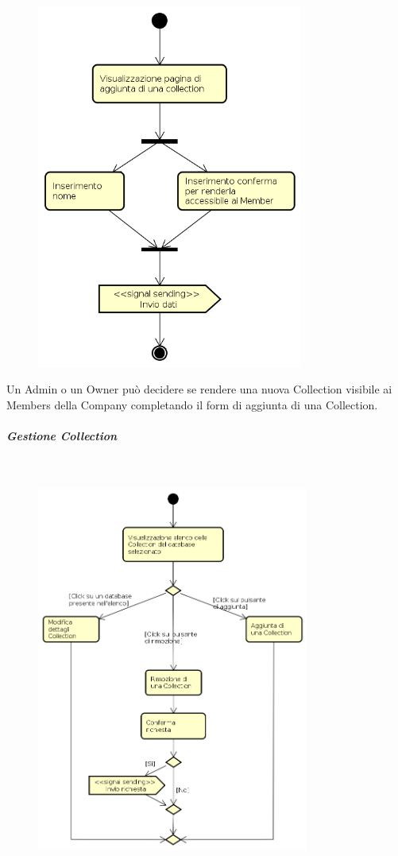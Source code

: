 \begin{figure}[H]
\begin{center}
\includegraphics[height=12cm]{res/sections/backend/activities/aggiuntaDatiCollection.png}
\end{center}
\end{figure}
Un Admin o un Owner può decidere se rendere una nuova Collection visibile ai Members della Company completando il form di aggiunta di una Collection.
\newpage
\subparagraph{Gestione Collection} \mbox{} \\
\begin{figure}[H]
\begin{center}
\includegraphics[height=12cm]{res/sections/backend/activities/gestioneCollectionAdmin.png}
\end{center}
\end{figure}
